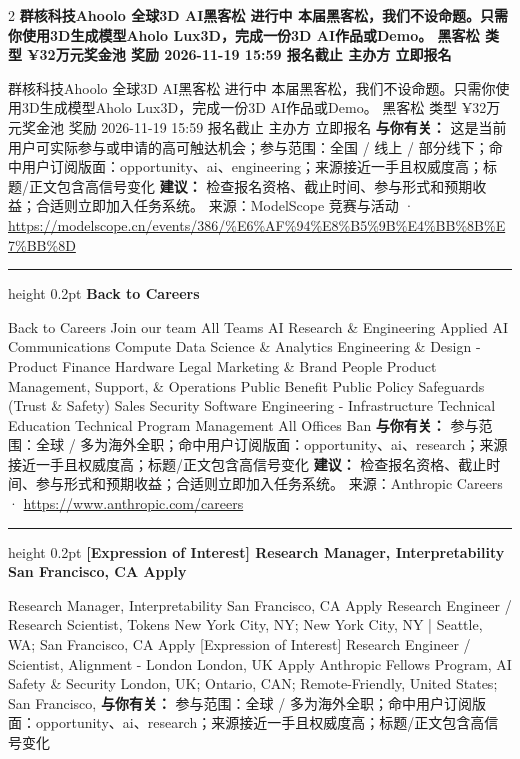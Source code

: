 \documentclass[10.5pt]{ctexart}
\begin{document}
\begin{multicols}{2}
{\large\bfseries 群核科技Ahoolo 全球3D AI黑客松 进行中 本届黑客松，我们不设命题。只需你使用3D生成模型Aholo Lux3D，完成一份3D AI作品或Demo。 黑客松 类型 ¥32万元奖金池 奖励 2026-11-19 15:59 报名截止 主办方 立即报名}\par
群核科技Ahoolo 全球3D AI黑客松 进行中 本届黑客松，我们不设命题。只需你使用3D生成模型Aholo Lux3D，完成一份3D AI作品或Demo。 黑客松 类型 ¥32万元奖金池 奖励 2026-11-19 15:59 报名截止 主办方 立即报名
\textbf{与你有关：} 这是当前用户可实际参与或申请的高可触达机会；参与范围：全国 / 线上 / 部分线下；命中用户订阅版面：opportunity、ai、engineering；来源接近一手且权威度高；标题/正文包含高信号变化
\textbf{建议：} 检查报名资格、截止时间、参与形式和预期收益；合适则立即加入任务系统。
{\footnotesize\color{ormuted} 来源：ModelScope 竞赛与活动 · \url{https://modelscope.cn/events/386/%E6%AF%94%E8%B5%9B%E4%BB%8B%E7%BB%8D}}
\vspace{2mm}
\hrule height 0.2pt
\vspace{2mm}
{\large\bfseries Back to Careers}\par
Back to Careers Join our team All Teams AI Research \& Engineering Applied AI Communications Compute Data Science \& Analytics Engineering \& Design - Product Finance Hardware Legal Marketing \& Brand People Product Management, Support, \& Operations Public Benefit Public Policy Safeguards (Trust \& Safety) Sales Security Software Engineering - Infrastructure Technical Education Technical Program Management All Offices Ban
\textbf{与你有关：} 参与范围：全球 / 多为海外全职；命中用户订阅版面：opportunity、ai、research；来源接近一手且权威度高；标题/正文包含高信号变化
\textbf{建议：} 检查报名资格、截止时间、参与形式和预期收益；合适则立即加入任务系统。
{\footnotesize\color{ormuted} 来源：Anthropic Careers · \url{https://www.anthropic.com/careers}}
\vspace{2mm}
\hrule height 0.2pt
\vspace{2mm}
{\large\bfseries [Expression of Interest] Research Manager, Interpretability San Francisco, CA Apply}\par
[Expression of Interest] Research Manager, Interpretability San Francisco, CA Apply Research Engineer / Research Scientist, Tokens New York City, NY; New York City, NY | Seattle, WA; San Francisco, CA Apply [Expression of Interest] Research Engineer / Scientist, Alignment - London London, UK Apply Anthropic Fellows Program, AI Safety \& Security London, UK; Ontario, CAN; Remote-Friendly, United States; San Francisco, 
\textbf{与你有关：} 参与范围：全球 / 多为海外全职；命中用户订阅版面：opportunity、ai、research；来源接近一手且权威度高；标题/正文包含高信号变化

\end{multicols}
\end{document}
